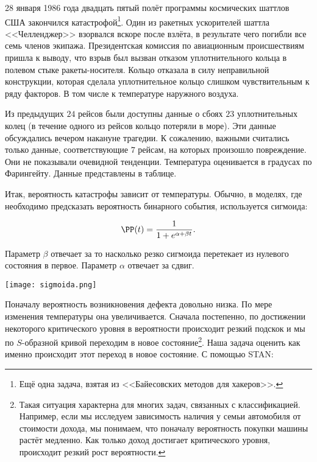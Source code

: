 \begin{problem}

28 января 1986 года двадцать пятый полёт программы космических шаттлов США закончился катастрофой\footnote{Ещё одна задача, взятая из <<Байесовских методов для хакеров>>. }. Один из ракетных ускорителей шаттла <<Челленджер>> взорвался вскоре после взлёта, в результате чего погибли все семь членов экипажа. Президентская комиссия по авиационным происшествиям пришла к выводу, что взрыв был вызван отказом уплотнительного кольца в полевом стыке ракеты-носителя. Кольцо отказала в силу неправильной конструкции, которая сделала уплотнительное кольцо слишком чувствительным к ряду факторов. В том числе к температуре наружного воздуха.

Из предыдущих $24$ рейсов были доступны данные о сбоях $23$ уплотнительных колец (в течение одного из рейсов кольцо потеряли в море).  Эти данные обсуждались вечером накануне трагедии. К сожалению,  важными считались только данные, соответствующие $7$ рейсам, на которых произошло повреждение. Они не показывали очевидной тенденции. Температура оценивается в градусах по Фарингейту. Данные представлены в таблице.


Итак, вероятность катастрофы зависит от температуры. Обычно, в моделях, где необходимо предсказать вероятность бинарного события, используется сигмоида: 

\[ \PP(t) = \frac{1}{1 + e^{\alpha + \beta t}}.\]

Параметр $\beta$ отвечает за то насколько резко сигмоида перетекает из нулевого состояния в первое. Параметр $\alpha$ отвечает за сдвиг. 

\begin{center}
\texttt{[image: sigmoida.png]}
\end{center}

Поначалу вероятность возникновения дефекта довольно низка. По мере изменения температуры она увеличивается. Сначала постепенно, по достижении некоторого критического уровня в вероятности происходит резкий подскок и мы по $S$-образной кривой переходим в новое состояние\footnote{Такая ситуация характерна для многих задач, связанных с классификацией. Например, если мы исследуем зависимость наличия у семьи автомобиля от стоимости дохода, мы понимаем, что поначалу вероятность покупки машины растёт медленно. Как только доход достигает критического уровня, происходит резкий рост вероятности.}. Наша задача оценить как именно происходит этот переход в новое состояние. С помощью STAN: 


\end{problem}
